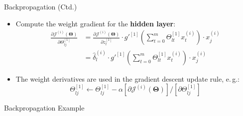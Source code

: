 \begin{frame}{Backpropagation (Ctd.)}{}\important
	\begin{itemize}
		\item Compute the weight gradient for the \textbf{hidden layer}:
		\begin{align*}
			\frac{\partial \mathcal{J}^{(i)}(\bm{\Theta})}{\partial \Theta_{lj}^{[1]}}
				&= \frac{\partial \mathcal{J}^{(i)}(\bm{\Theta})}{\partial z_l^{[1]}} \cdot g'^{[1]} \left( \sum_{t=0}^m \Theta_{lt}^{[1]} x_t^{(i)} \right) \cdot x_j^{(i)} \\
				&= \widehat{\delta}_l^{(i)} \cdot g'^{[1]} \left( \sum_{t=0}^m \Theta_{lt}^{[1]} x_t^{(i)} \right) \cdot x_j^{(i)}
		\end{align*}
		\item The weight derivatives are used in the gradient descent update rule, e.\,g.:
		\begin{equation*}
			\Theta_{lj}^{[1]} \longleftarrow \Theta_{lj}^{[1]} - \alpha [\partial \mathcal{J}^{(i)}(\bm{\Theta})]/[\partial \Theta_{lj}^{[1]}]
		\end{equation*}
	\end{itemize}
\end{frame}


\begin{frame}{Backpropagation Example}{}
	\vfill
	\begin{center}
		\Huge {}
	\end{center}
	\vfill
\end{frame}


